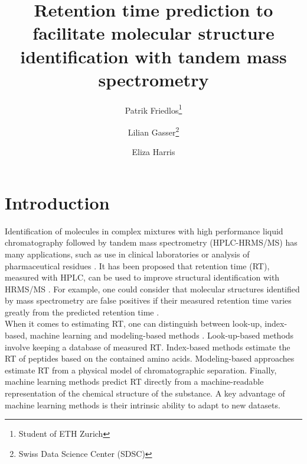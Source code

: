 \documentclass{article}
\title{Retention time prediction to facilitate molecular structure identification with tandem mass spectrometry}
\author{Patrik Friedlos\thanks{Student of ETH Zurich}\\
  \and Lilian Gasser\thanks{Swiss Data Science Center (SDSC)}
   \and Eliza Harris\footnotemark[2]
}
\begin{document}
\maketitle


\section{Introduction}

Identification of molecules in complex mixtures with high performance liquid chromatography followed by tandem mass spectrometry (HPLC-HRMS/MS) has many applications, such as use in clinical laboratories or analysis of pharmaceutical residues \cite{van2012role, petrovic2005liquid}. It has been proposed that retention time (RT), measured with HPLC, can be used to improve structural identification with HRMS/MS \cite{strittmatter2004application}. For example, one could consider that molecular structures identified by mass spectrometry are false positives if their measured retention time varies greatly from the predicted retention time \cite{yang2021prediction}.\\

When it comes to estimating RT, one can distinguish between look-up, index-based, machine learning and modeling-based methods \cite{moruz2017peptide}. Look-up-based methods involve keeping a database of measured RT. Index-based methods estimate the RT of peptides based on the contained amino acids. Modeling-based approaches estimate RT from a physical model of chromatographic separation. Finally, machine learning methods predict RT directly from a machine-readable representation of the chemical structure of the substance. A key advantage of machine learning methods is their intrinsic ability to adapt to new datasets.\\
\end{document}
